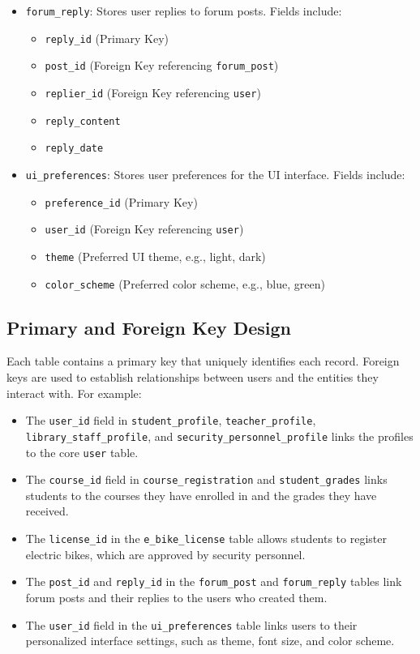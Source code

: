 \documentclass[12pt]{article}
\begin{document}
\begin{itemize}
    \item \texttt{forum\_reply}: Stores user replies to forum posts. Fields include:
    \begin{itemize}
        \item \texttt{reply\_id} (Primary Key)
        \item \texttt{post\_id} (Foreign Key referencing \texttt{forum\_post})
        \item \texttt{replier\_id} (Foreign Key referencing \texttt{user})
        \item \texttt{reply\_content}
        \item \texttt{reply\_date}
    \end{itemize}

    \item \texttt{ui\_preferences}: Stores user preferences for the UI interface. Fields include:
    \begin{itemize}
        \item \texttt{preference\_id} (Primary Key)
        \item \texttt{user\_id} (Foreign Key referencing \texttt{user})
        \item \texttt{theme} (Preferred UI theme, e.g., light, dark)
        \item \texttt{color\_scheme} (Preferred color scheme, e.g., blue, green)
    \end{itemize}
\end{itemize}

\subsection{Primary and Foreign Key Design}
Each table contains a primary key that uniquely identifies each record. Foreign keys are used to establish relationships between users and the entities they interact with. For example:
\begin{itemize}
    \item The \texttt{user\_id} field in \texttt{student\_profile}, \texttt{teacher\_profile},
    \texttt{library\_staff\_profile}, and \texttt{security\_personnel\_profile} links the
    profiles to the core \texttt{user} table.
    \item The \texttt{course\_id} field in \texttt{course\_registration} and \texttt{student\_grades} links
    students to the courses they have enrolled in and the grades they have received.
    \item The \texttt{license\_id} in the \texttt{e\_bike\_license} table allows students
    to register electric bikes, which are approved by security personnel.
    \item The \texttt{post\_id} and \texttt{reply\_id} in the \texttt{forum\_post} and \texttt{forum\_reply}
    tables link forum posts and their replies to the users who created them.
    \item The \texttt{user\_id} field in the \texttt{ui\_preferences} table links users to their personalized
    interface settings, such as theme, font size, and color scheme.
\end{itemize}
\end{document}
